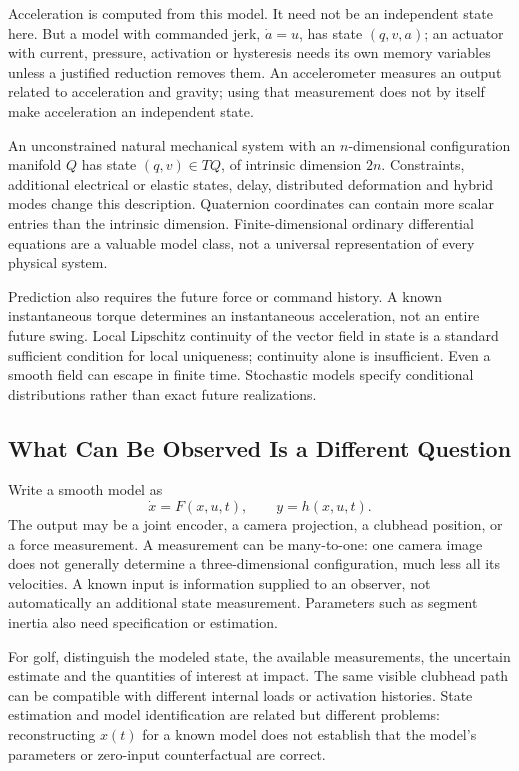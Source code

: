 Acceleration is computed from this model. It need not be an independent state here. But a model with commanded jerk, $\dot a=u$, has state $(q,v,a)$; an actuator with current, pressure, activation or hysteresis needs its own memory variables unless a justified reduction removes them. An accelerometer measures an output related to acceleration and gravity; using that measurement does not by itself make acceleration an independent state.

An unconstrained natural mechanical system with an $n$-dimensional configuration manifold $Q$ has state $(q,v)\in TQ$, of intrinsic dimension $2n$. Constraints, additional electrical or elastic states, delay, distributed deformation and hybrid modes change this description. Quaternion coordinates can contain more scalar entries than the intrinsic dimension. Finite-dimensional ordinary differential equations are a valuable model class, not a universal representation of every physical system.

Prediction also requires the future force or command history. A known instantaneous torque determines an instantaneous acceleration, not an entire future swing. Local Lipschitz continuity of the vector field in state is a standard sufficient condition for local uniqueness; continuity alone is insufficient. Even a smooth field can escape in finite time. Stochastic models specify conditional distributions rather than exact future realizations.

\subsection{What Can Be Observed Is a Different Question}
\label{sec:output_equations}

Write a smooth model as
\begin{equation}
\label{eq:state_output_general}
 \dot x=F(x,u,t),\qquad y=h(x,u,t).
\end{equation}
\label{pr:fund_eq}
The output may be a joint encoder, a camera projection, a clubhead position, or a force measurement. A measurement can be many-to-one: one camera image does not generally determine a three-dimensional configuration, much less all its velocities. A known input is information supplied to an observer, not automatically an additional state measurement. Parameters such as segment inertia also need specification or estimation.

For golf, distinguish the modeled state, the available measurements, the uncertain estimate and the quantities of interest at impact. The same visible clubhead path can be compatible with different internal loads or activation histories. State estimation and model identification are related but different problems: reconstructing $x(t)$ for a known model does not establish that the model's parameters or zero-input counterfactual are correct.

